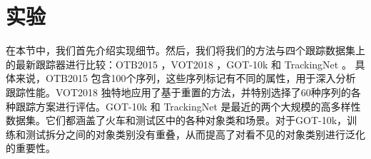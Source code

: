 \section{实验}
在本节中，我们首先介绍实现细节。然后，我们将我们的方法与四个跟踪数据集上的最新跟踪器进行比较：OTB2015 \cite{OTB}，VOT2018 \cite{kristan2018sixth}，GOT-10k \cite{GOT-10k} 和 TrackingNet \cite{muller2018trackingnet}。 具体来说，OTB2015 \cite{OTB} 包含100个序列，这些序列标记有不同的属性，用于深入分析跟踪性能。VOT2018 \cite{kristan2018sixth} 独特地应用了基于重置的方法，并特别选择了60种序列的各种跟踪方案进行评估。GOT-10k \cite{GOT-10k} 和 TrackingNet \cite{muller2018trackingnet} 是最近的两个大规模的高多样性数据集。它们都涵盖了火车和测试区中的各种对象类和场景。对于GOT-10k，训练和测试拆分之间的对象类别没有重叠，从而提高了对看不见的对象类别进行泛化的重要性。

